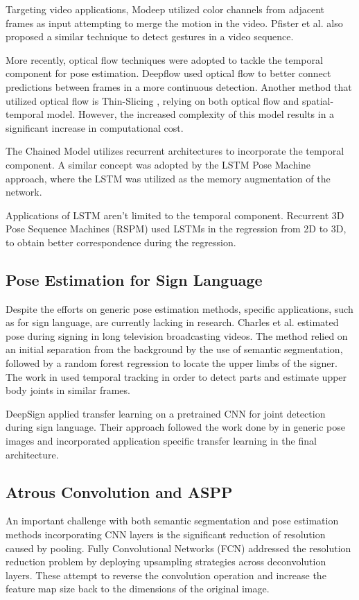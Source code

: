 \documentclass[10pt,twocolumn,letterpaper]{article}
\begin{document}
Targeting video applications, Modeep \cite{Modeep} utilized color channels from adjacent frames as input attempting to merge the motion in the video. Pfister et al. \cite{GesturePose} also proposed a similar technique to detect gestures in a video sequence.

More recently, optical flow techniques were adopted to tackle the temporal component for pose estimation. 
Deepflow \cite{Deepflow} used optical flow to better connect predictions between frames in a more continuous detection. Another method that utilized
optical flow is Thin-Slicing \cite{Thin-Slicing}, relying on both optical flow and spatial-temporal model. 
However, the increased complexity of this model results in a significant increase in computational cost.

The Chained Model \cite{Chained} utilizes recurrent architectures to incorporate the temporal component. 
A similar concept was adopted 
by the LSTM Pose Machine \cite{LSTM-PM} approach, where the LSTM was utilized as the memory augmentation of the network.

Applications of LSTM aren't limited to the temporal component. 
Recurrent 3D Pose Sequence Machines (RSPM) \cite{RSPM} used LSTMs in the regression from 2D to 3D, 
to obtain better correspondence during the regression.

\subsection{Pose Estimation for Sign Language}
Despite the efforts on generic pose estimation methods, specific applications, such as for sign language, are currently lacking in research.
Charles et al. \cite{AutomaticSign} estimated pose during signing in long television broadcasting videos. The method relied on an initial separation from the background by the use of semantic segmentation, followed by a random forest regression to locate the upper limbs of the signer.
The work in \cite{UpperBodySign} used temporal tracking in order to detect parts and estimate upper body joints in similar frames. 


DeepSign \cite{DeepSign} applied transfer learning on a pretrained CNN  for joint detection during sign language. Their approach followed the work done by \cite{DeepPose} in generic pose images and incorporated application specific transfer learning in the final architecture.

\subsection{Atrous Convolution and ASPP}
An important challenge with both semantic segmentation and pose estimation methods incorporating CNN layers is the significant reduction of resolution caused by pooling.
Fully Convolutional Networks (FCN) \cite{FCN} \cite{FCN} addressed the resolution reduction problem by deploying upsampling strategies across deconvolution layers.  
These attempt to reverse the convolution operation and increase the feature map size back to the dimensions of the original image.
\end{document}
